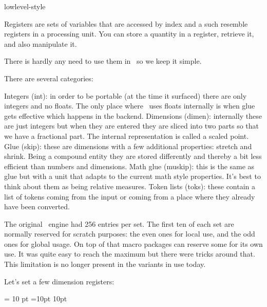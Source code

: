 
\environment lowlevel-style

\startdocument
  [title=registers,
   color=darkmagenta]

\startsection[title=Preamble]

Registers are sets of variables that are accessed by index and a such resemble
registers in a processing unit. You can store a quantity in a register, retrieve
it, and also manipulate it.

There is hardly any need to use them in \CONTEXT\ so we keep it simple.

\stopsection

\startsection[title={\TEX\ primitives}]

There are several categories:

\startitemize
\startitem
    Integers (int): in order to be portable (at the time it surfaced) there are only
    integers and no floats. The only place where \TEX\ uses floats internally is
    when glue gets effective which happens in the backend.
\stopitem
\startitem
    Dimensions (dimen): internally these are just integers but when they are entered they
    are sliced into two parts so that we have a fractional part. The internal
    representation is called a scaled point.
\stopitem
\startitem
    Glue (skip): these are dimensions with a few additional properties: stretch and
    shrink. Being a compound entity they are stored differently and thereby a bit
    less efficient than numbers and dimensions.
\stopitem
\startitem
    Math glue (muskip): this is the same as glue but with a unit that adapts to
    the current math style properties. It's best to think about them as being
    relative measures.
\stopitem
\startitem
    Token lists (toks): these contain a list of tokens coming from the input
    or coming from a place where they already have been converted.
\stopitem
\stopitemize

The original \TEX\ engine had 256 entries per set. The first ten of each set are
normally reserved for scratch purposes: the even ones for local use, and the odd
ones for global usage. On top of that macro packages can reserve some for its own
use. It was quite easy to reach the maximum but there were tricks around that.
This limitation is no longer present in the variants in use today.

Let's set a few dimension registers:

\startbuffer[1]
 = 10 pt
=10pt
 10pt
\scratchdimen 10pt
\stopbuffer

